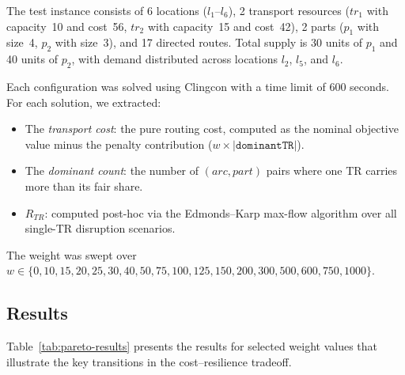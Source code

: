 \documentclass{article}
\begin{document}
The test instance consists of 6 locations ($l_1$--$l_6$), 2 transport resources ($tr_1$ with capacity~10 and cost~56, $tr_2$ with capacity~15 and cost~42), 2 parts ($p_1$ with size~4, $p_2$ with size~3), and 17 directed routes. Total supply is 30 units of $p_1$ and 40 units of $p_2$, with demand distributed across locations $l_2$, $l_5$, and $l_6$.

Each configuration was solved using Clingcon with a time limit of 600 seconds. For each solution, we extracted:
\begin{itemize}
    \item The \emph{transport cost}: the pure routing cost, computed as the nominal objective value minus the penalty contribution ($w \times |\texttt{dominantTR}|$).
    \item The \emph{dominant count}: the number of $(arc, part)$ pairs where one TR carries more than its fair share.
    \item $R_{TR}$: computed post-hoc via the Edmonds--Karp max-flow algorithm over all single-TR disruption scenarios.
\end{itemize}

The weight was swept over $w \in \{0, 10, 15, 20, 25, 30, 40, 50, 75, 100, 125, 150, 200, 300, 500, 600, 750, 1000\}$.

\subsection{Results}

Table~\ref{tab:pareto-results} presents the results for selected weight values that illustrate the key transitions in the cost--resilience tradeoff.
\end{document}

